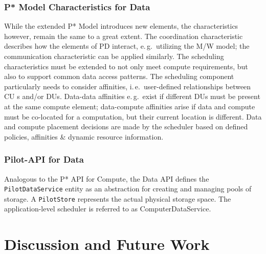 \documentclass[conference,final]{IEEEtran}
\newcommand{\cu}{CU\xspace}
\newcommand{\upp}{\vspace*{-0.5em}}
\begin{document}
\subsubsection*{P* Model Characteristics for Data}

While the extended P* Model introduces new elements, the
characteristics however, remain the same to a great extent. The
coordination characteristic describes how the elements of PD interact,
e.\,g.\ utilizing the M/W model; the communication characteristic can
be applied similarly. The scheduling characteristics must be extended
to not only meet compute requirements, but also to support common data
access patterns. The scheduling component particularly needs to
consider affinities, i.\,e.\ user-defined relationships between \cu s
and/or DUs. Data-data affinities e.\,g.\ exist if different DUs must
be present at the same compute element; data-compute affinities arise
if data and compute must be co-located for a computation, but their
current location is different. Data and compute placement decisions are
made by the scheduler based on defined policies, affinities \& dynamic
resource information.


\subsubsection*{Pilot-API for Data}

Analogous to the P* API for Compute, the Data API defines the
\texttt{PilotDataService} entity as an abstraction for creating and managing
pools of storage. A \texttt{PilotStore} represents the actual physical storage 
space. The application-level scheduler is referred to as ComputerDataService.



% 
% 



\section{Discussion and Future Work \upp\upp}
\label{sec:discussion-future-work}
\end{document}
